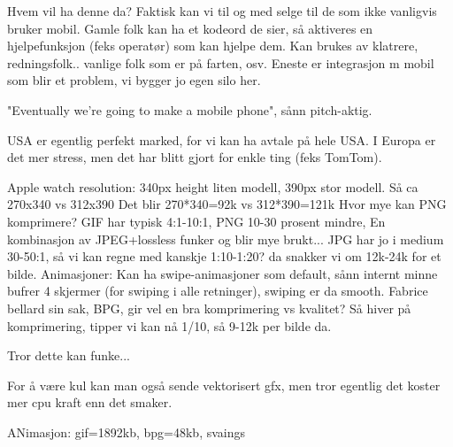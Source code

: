 Hvem vil ha denne da? Faktisk kan vi til og med selge til de som ikke vanligvis
bruker mobil. Gamle folk kan ha et kodeord de sier, så aktiveres en
hjelpefunksjon (feks operatør) som kan hjelpe dem. Kan brukes av klatrere,
redningsfolk.. vanlige folk som er på farten, osv. Eneste er integrasjon m
mobil som blir et problem, vi bygger jo egen silo her.

"Eventually we're going to make a mobile phone", sånn pitch-aktig.

USA er egentlig perfekt marked, for vi kan ha avtale på hele USA. I Europa er
det mer stress, men det har blitt gjort for enkle ting (feks TomTom).

Apple watch resolution: 340px height liten modell, 390px stor modell.
Så ca 270x340 vs 312x390
Det blir 270*340=92k vs 312*390=121k
Hvor mye kan PNG komprimere? GIF har typisk 4:1-10:1, PNG 10-30 prosent mindre,
En kombinasjon av JPEG+lossless funker og blir mye brukt... JPG har jo i medium
30-50:1, så vi kan regne med kanskje 1:10-1:20? da snakker vi om 12k-24k for et
bilde. Animasjoner: Kan ha swipe-animasjoner som default, sånn internt minne
bufrer 4 skjermer (for swiping i alle retninger), swiping er da smooth.
Fabrice bellard sin sak, BPG, gir vel en bra komprimering vs kvalitet?
Så hiver på komprimering, tipper vi kan nå 1/10, så 9-12k per bilde da.

Tror dette kan funke...

For å være kul kan man også sende vektorisert gfx, men tror egentlig det
koster mer cpu kraft enn det smaker.

ANimasjon: gif=1892kb, bpg=48kb, svaings
